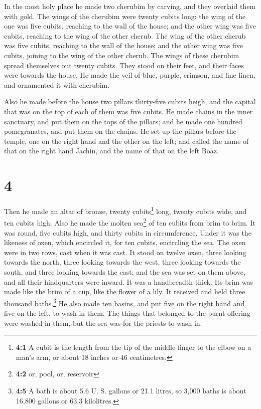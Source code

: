  In the most holy place he made two cherubim by carving,
and they overlaid them with gold.  The wings of the
cherubim were twenty cubits long: the wing of the one was five cubits,
reaching to the wall of the house; and the other wing was five cubits,
reaching to the wing of the other cherub.  The wing of
the other cherub was five cubits, reaching to the wall of the house; and
the other wing was five cubits, joining to the wing of the other cherub.
 The wings of these cherubim spread themselves out twenty
cubits. They stood on their feet, and their faces were towards the
house.  He made the veil of blue, purple, crimson, and
fine linen, and ornamented it with cherubim.

 Also he made before the house two pillars thirty-five
cubits heigh, and the capital that was on the top of each of them was
five cubits.  He made chains in the inner sanctuary, and
put them on the tops of the pillars; and he made one hundred
pomegranates, and put them on the chains.  He set up the
pillars before the temple, one on the right hand and the other on the
left; and called the name of that on the right hand Jachin, and the name
of that on the left Boaz.

\hypertarget{section-3}{%
\section{4}\label{section-3}}

 Then he made an altar of bronze, twenty cubits\footnote{\textbf{4:1}
  A cubit is the length from the tip of the middle finger to the elbow
  on a man's arm, or about 18 inches or 46 centimetres.} long, twenty
cubits wide, and ten cubits high.  Also he made the molten
sea\footnote{\textbf{4:2} or, pool, or, reservoir} of ten cubits from
brim to brim. It was round, five cubits high, and thirty cubits in
circumference.  Under it was the likeness of oxen, which
encircled it, for ten cubits, encircling the sea. The oxen were in two
rows, cast when it was cast.  It stood on twelve oxen,
three looking towards the north, three looking towards the west, three
looking towards the south, and three looking towards the east; and the
sea was set on them above, and all their hindquarters were inward.
 It was a handbreadth thick. Its brim was made like the
brim of a cup, like the flower of a lily. It received and held three
thousand baths.\footnote{\textbf{4:5} A bath is about 5.6 U. S. gallons
  or 21.1 litres, so 3,000 baths is about 16,800 gallons or 63.3
  kilolitres.}  He also made ten basins, and put five on
the right hand and five on the left, to wash in them. The things that
belonged to the burnt offering were washed in them, but the sea was for
the priests to wash in.

